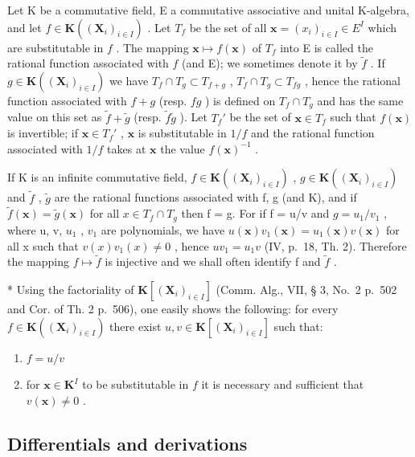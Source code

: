 Let K be a commutative field, E a commutative associative and unital K-algebra, and let \(f \in \mathbf{K}((\mathbf{X}_i)_{i \in I})\) . Let \(T_f\) be the set of all \(\mathbf{x} = (x_i)_{i \in I} \in E^{I}\) which are substitutable in \(f\) . The mapping \(\mathbf{x} \mapsto f(\mathbf{x})\) of \(T_f\) into E is called the rational function associated with \(f\) (and E); we sometimes denote it by \(\tilde{f}\) . If \(g \in \mathbf{K}((\mathbf{X}_i)_{i \in I})\) we have \(T_f \cap T_g \subset T_{f + g}\) , \(T_f \cap T_g \subset T_{fg}\) , hence the rational function associated with \(f + g\) (resp. \(fg\) ) is defined on \(T_f \cap T_g\) and has the same value on this set as \(\tilde{f} + \tilde{g}\) (resp. \(\tilde{f}\tilde{g}\) ). Let \(T_f'\) be the set of \(\mathbf{x} \in T_f\) such that \(f(\mathbf{x})\) is invertible; if \(\mathbf{x} \in T_f'\) , \(\mathbf{x}\) is substitutable in \(1/f\) and the rational function associated with \(1/f\) takes at \(\mathbf{x}\) the value \(f(\mathbf{x})^{-1}\) .

If K is an infinite commutative field, \(f \in \mathbf{K}((\mathbf{X}_i)_{i \in I})\) , \(g \in \mathbf{K}((\mathbf{X}_i)_{i \in I})\) and \(\tilde{f}\) , \(\tilde{g}\) are the rational functions associated with f, g (and K), and if \(\tilde{f}(\mathbf{x}) = \tilde{g}(\mathbf{x})\) for all \(x \in T_f \cap T_g\) then f = g. For if f = u/v and \(g = u_1 / v_1\) , where u, v, \(u_1\) , \(v_1\) are polynomials, we have \(u(\mathbf{x})v_1(\mathbf{x}) = u_1(\mathbf{x})v(\mathbf{x})\) for all x such that \(v(x)v_1(x) \neq 0\) , hence \(uv_1 = u_1v\) (IV, p.~18, Th. 2). Therefore the mapping \(f \mapsto \tilde{f}\) is injective and we shall often identify f and \(\tilde{f}\) .

* Using the factoriality of \(\mathbf{K}[(\mathbf{X}_i)_{i\in I}]\) (Comm. Alg., VII, § 3, No.~2 p.~502 and Cor. of Th. 2 p.~506), one easily shows the following: for every \(f\in \mathbf{K}((\mathbf{X}_i)_{i\in I})\) there exist \(u,v\in \mathbf{K}[(\mathbf{X}_i)_{i\in I}]\) such that:

\begin{enumerate}
\def\labelenumi{\arabic{enumi})}
\item
  \(f = u / v\)
\item
  for \(\mathbf{x} \in \mathbf{K}^{I}\) to be substitutable in \(f\) it is necessary and sufficient that \(v(\mathbf{x}) \neq 0\) .
\end{enumerate}

\subsection{Differentials and derivations}

